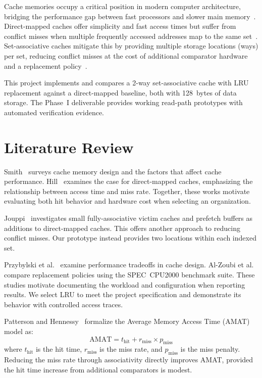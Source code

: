 \documentclass[conference]{IEEEtran}
\begin{document}
Cache memories occupy a critical position in modern computer architecture,
bridging the performance gap between fast processors and slower main
memory~\cite{patterson2017}.  Direct-mapped caches offer simplicity and
fast access times but suffer from conflict misses when multiple frequently
accessed addresses map to the same set~\cite{hill1988}.  Set-associative
caches mitigate this by providing multiple storage locations (ways) per set,
reducing conflict misses at the cost of additional comparator hardware and a
replacement policy~\cite{hennessy2019}.

This project implements and compares a 2-way set-associative cache with LRU
replacement against a direct-mapped baseline, both with 128~bytes of data
storage.  The Phase~I deliverable provides working read-path prototypes with
automated verification evidence.

\section{Literature Review}

Smith~\cite{smith1982} surveys cache memory design and the factors that affect cache performance. Hill~\cite{hill1988} examines the case for direct-mapped caches, emphasizing the relationship between access time and miss rate. Together, these works motivate evaluating both hit behavior and hardware cost when selecting an organization.

Jouppi~\cite{jouppi1990} investigates small fully-associative victim caches and prefetch buffers as additions to direct-mapped caches. This offers another approach to reducing conflict misses. Our prototype instead provides two locations within each indexed set.

Przybylski et al.~\cite{przybylski1988} examine performance tradeoffs in cache design. Al-Zoubi et al.~\cite{al-zoubi2004} compare replacement policies using the SPEC~CPU2000 benchmark suite. These studies motivate documenting the workload and configuration when reporting results. We select LRU to meet the project specification and demonstrate its behavior with controlled access traces.

Patterson and Hennessy~\cite{patterson2017} formalize the Average Memory
Access Time (AMAT) model as:
\begin{equation}
\text{AMAT} = t_{\text{hit}} + r_{\text{miss}} \times p_{\text{miss}}
\label{eq:amat}
\end{equation}
where $t_{\text{hit}}$ is the hit time, $r_{\text{miss}}$ is the miss
rate, and $p_{\text{miss}}$ is the miss penalty.  Reducing the miss rate
through associativity directly improves AMAT, provided the hit time
increase from additional comparators is modest.
\end{document}

